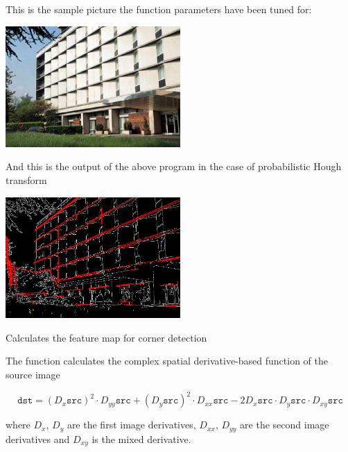 This is the sample picture the function parameters have been tuned for:

\includegraphics[width=0.5\textwidth]{pics/building.jpg}

And this is the output of the above program in the case of probabilistic Hough transform

\includegraphics[width=0.5\textwidth]{pics/houghp.png}

Calculates the feature map for corner detection

\begin{description}
\end{description}

The function calculates the complex spatial derivative-based function of the source image

\[
\texttt{dst} = (D_x \texttt{src})^2 \cdot D_{yy} \texttt{src} + (D_y \texttt{src})^2 \cdot D_{xx} \texttt{src} - 2 D_x \texttt{src} \cdot D_y \texttt{src} \cdot D_{xy} \texttt{src}
\]

where $D_x$, $D_y$ are the first image derivatives, $D_{xx}$, $D_{yy}$ are the second image derivatives and $D_{xy}$ is the mixed derivative.


